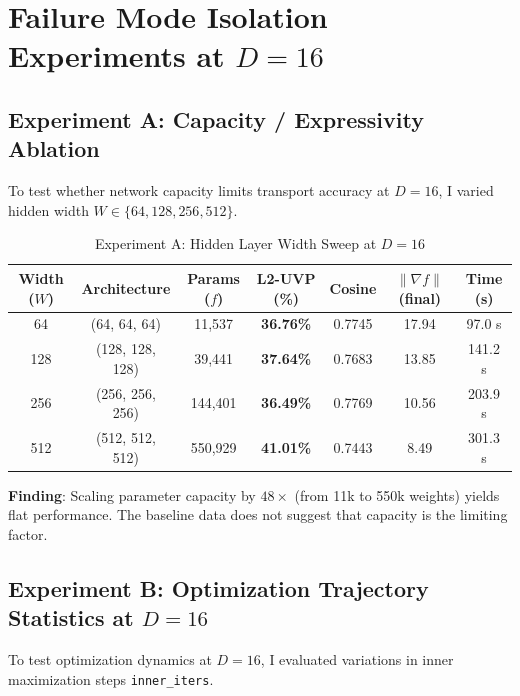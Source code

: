 \documentclass[11pt,a4paper]{article}
\begin{document}
\section{Failure Mode Isolation Experiments at $D=16$}

\subsection{Experiment A: Capacity / Expressivity Ablation}
To test whether network capacity limits transport accuracy at $D=16$, I varied hidden width $W \in \{64, 128, 256, 512\}$.

\begin{table}[h]
\centering
\caption{Experiment A: Hidden Layer Width Sweep at $D=16$}
\label{tab:exp_a}
\begin{tabular}{ccccccc}
\toprule
\textbf{Width ($W$)} & \textbf{Architecture} & \textbf{Params ($f$)} & \textbf{L2-UVP (\%)} & \textbf{Cosine} & \textbf{$\|\nabla f\|$ (final)} & \textbf{Time (s)} \\
\midrule
64  & (64, 64, 64)   & 11,537  & \textbf{36.76\%} & 0.7745 & 17.94 & 97.0 s \\
128 & (128, 128, 128) & 39,441  & \textbf{37.64\%} & 0.7683 & 13.85 & 141.2 s \\
256 & (256, 256, 256) & 144,401 & \textbf{36.49\%} & 0.7769 & 10.56 & 203.9 s \\
512 & (512, 512, 512) & 550,929 & \textbf{41.01\%} & 0.7443 & 8.49  & 301.3 s \\
\bottomrule
\end{tabular}
\end{table}

\textbf{Finding}: Scaling parameter capacity by $48\times$ (from 11k to 550k weights) yields flat performance. The baseline data does not suggest that capacity is the limiting factor.

\subsection{Experiment B: Optimization Trajectory Statistics at $D=16$}
To test optimization dynamics at $D=16$, I evaluated variations in inner maximization steps \texttt{inner\_iters}.
\end{document}
